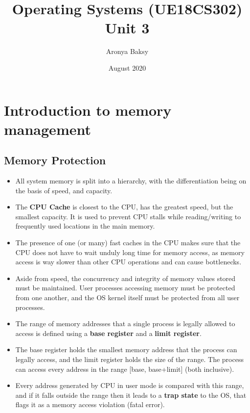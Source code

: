 \documentclass{article}
\title{Operating Systems (UE18CS302)\\
    \large Unit 3}
\author{Aronya Baksy}
\date{August 2020}
\theoremstyle{plain}
\theoremstyle{definition}
\begin{document}
    \maketitle

\section{Introduction to memory management}
\subsection{Memory Protection}
\begin{itemize}
    \item All system memory is split into a hierarchy, with the differentiation being on the basis of speed, and capacity.
    
    \item The \textbf{CPU Cache} is closest to the CPU, has the greatest speed, but the smallest capacity. It is used to prevent CPU stalls while reading/writing to frequently used locations in the main memory.
    
    \item The presence of one (or many) fast caches in the CPU makes sure that the CPU does not have to wait unduly long time for memory access, as memory access is way slower than other CPU operations and can cause bottlenecks.
    
    \item Aside from speed, the concurrency and integrity of memory values stored must be maintained. User processes accessing memory must be protected from one another, and the OS kernel itself must be protected from all user processes. 
    
    \item The range of memory addresses that a single process is legally allowed to access is defined using a \textbf{base register} and a \textbf{limit register}.
    
    \item The base register holds the smallest memory address that the process can legally access, and the limit register holds the size of the range. The process can access every address in the range [base, base+limit] (both inclusive). 
    
    \item Every address generated by CPU in user mode is compared with this range, and if it falls outside the range then it leads to a \textbf{trap state} to the OS, that flags it as a memory access violation (fatal error). 
\end{itemize}
\end{document}
